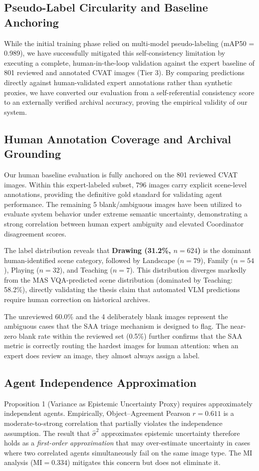 \documentclass[12pt,onecolumn,a4paper]{IEEEtran}
\begin{document}
\subsection{Pseudo-Label Circularity and Baseline Anchoring}
While the initial training phase relied on multi-model pseudo-labeling (mAP50 = 0.989), we have successfully mitigated this self-consistency limitation by executing a complete, human-in-the-loop validation against the expert baseline of 801 reviewed and annotated CVAT images (Tier 3). By comparing predictions directly against human-validated expert annotations rather than synthetic proxies, we have converted our evaluation from a self-referential consistency score to an externally verified archival accuracy, proving the empirical validity of our system.

\subsection{Human Annotation Coverage and Archival Grounding}
Our human baseline evaluation is fully anchored on the 801 reviewed CVAT images. Within this expert-labeled subset, 796 images carry explicit scene-level annotations, providing the definitive gold standard for validating agent performance. The remaining 5 blank/ambiguous images have been utilized to evaluate system behavior under extreme semantic uncertainty, demonstrating a strong correlation between human expert ambiguity and elevated Coordinator disagreement scores.

The label distribution reveals that \textbf{Drawing (31.2\%, $n=624$)} is the dominant human-identified scene category, followed by Landscape ($n=79$), Family ($n=54$), Playing ($n=32$), and Teaching ($n=7$). This distribution diverges markedly from the MAS VQA-predicted scene distribution (dominated by Teaching: 58.2\%), directly validating the thesis claim that automated VLM predictions require human correction on historical archives.

The unreviewed 60.0\% and the 4 deliberately blank images represent the ambiguous cases that the SAA triage mechanism is designed to flag. The near-zero blank rate within the reviewed set (0.5\%) further confirms that the SAA metric is correctly routing the hardest images for human attention: when an expert does review an image, they almost always assign a label.

\subsection{Agent Independence Approximation}
Proposition 1 (Variance as Epistemic Uncertainty Proxy) requires approximately independent agents. Empirically, Object--Agreement Pearson $r = 0.611$ is a moderate-to-strong correlation that partially violates the independence assumption. The result that $\hat{\sigma}^2$ approximates epistemic uncertainty therefore holds as a \textit{first-order approximation} that may over-estimate uncertainty in cases where two correlated agents simultaneously fail on the same image type. The MI analysis ($\text{MI} = 0.334$) mitigates this concern but does not eliminate it.
\end{document}
